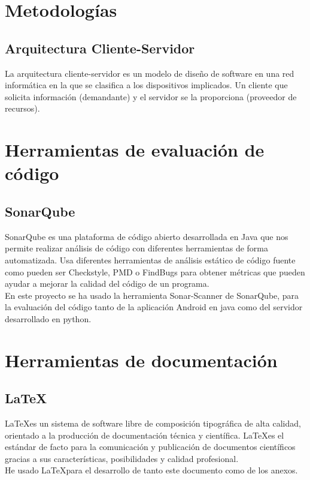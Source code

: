 \section{Metodologías}

\subsection{Arquitectura Cliente-Servidor}

La arquitectura cliente-servidor es un modelo de diseño de software en una red informática en la que se clasifica a los dispositivos implicados. Un cliente que solicita información (demandante) y el servidor se la proporciona (proveedor de recursos).



\section{Herramientas de evaluación de código}

\subsection{SonarQube}

SonarQube es una plataforma de código abierto desarrollada en Java que nos permite realizar análisis de código con diferentes herramientas de forma automatizada. Usa diferentes herramientas de análisis estático de código fuente como pueden ser Checkstyle, PMD o FindBugs para obtener métricas que pueden ayudar a mejorar la calidad del código de un programa.\\
En este proyecto se ha usado la herramienta Sonar-Scanner de SonarQube, para la evaluación del código tanto de la aplicación Android en java como del servidor desarrollado en python.



\section{Herramientas de documentación}

\subsection{\LaTeX}

\LaTeX es un sistema de software libre de composición tipográfica de alta calidad, orientado a la producción de documentación técnica y científica. \LaTeX es el estándar de facto para la comunicación y publicación de documentos científicos gracias a sus características, posibilidades y calidad profesional.\\
He usado \LaTeX para el desarrollo de tanto este documento como de los anexos.

